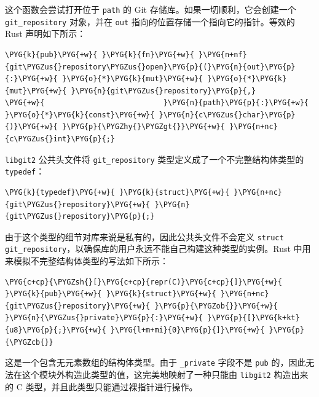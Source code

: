 这个函数会尝试打开位于 \texttt{path} 的 Git 存储库。如果一切顺利，它会创建一个 \texttt{git\_repository} 对象，并在 \texttt{out} 指向的位置存储一个指向它的指针。等效的 Rust 声明如下所示：

\begin{Verbatim}[commandchars=\\\{\},breaklines=true,breakanywhere=true,fontsize=\codefont,xleftmargin=17bp]
\PYG{k}{pub}\PYG{+w}{ }\PYG{k}{fn}\PYG{+w}{ }\PYG{n+nf}{git\PYGZus{}repository\PYGZus{}open}\PYG{p}{(}\PYG{n}{out}\PYG{p}{:}\PYG{+w}{ }\PYG{o}{*}\PYG{k}{mut}\PYG{+w}{ }\PYG{o}{*}\PYG{k}{mut}\PYG{+w}{ }\PYG{n}{git\PYGZus{}repository}\PYG{p}{,}
\PYG{+w}{                           }\PYG{n}{path}\PYG{p}{:}\PYG{+w}{ }\PYG{o}{*}\PYG{k}{const}\PYG{+w}{ }\PYG{n}{c\PYGZus{}char}\PYG{p}{)}\PYG{+w}{ }\PYG{p}{\PYGZhy{}\PYGZgt{}}\PYG{+w}{ }\PYG{n+nc}{c\PYGZus{}int}\PYG{p}{;}
\end{Verbatim}

\texttt{libgit2} 公共头文件将 \texttt{git\_repository} 类型定义成了一个不完整结构体类型的 \texttt{typedef}：

\begin{Verbatim}[commandchars=\\\{\},breaklines=true,breakanywhere=true,fontsize=\codefont,xleftmargin=17bp]
\PYG{k}{typedef}\PYG{+w}{ }\PYG{k}{struct}\PYG{+w}{ }\PYG{n+nc}{git\PYGZus{}repository}\PYG{+w}{ }\PYG{n}{git\PYGZus{}repository}\PYG{p}{;}
\end{Verbatim}

由于这个类型的细节对库来说是私有的，因此公共头文件不会定义 \texttt{struct git\_repository}，以确保库的用户永远不能自己构建这种类型的实例。Rust 中用来模拟不完整结构体类型的写法如下所示：

\begin{Verbatim}[commandchars=\\\{\},breaklines=true,breakanywhere=true,fontsize=\codefont,xleftmargin=17bp]
\PYG{c+cp}{\PYGZsh{}[}\PYG{c+cp}{repr(C)}\PYG{c+cp}{]}\PYG{+w}{ }\PYG{k}{pub}\PYG{+w}{ }\PYG{k}{struct}\PYG{+w}{ }\PYG{n+nc}{git\PYGZus{}repository}\PYG{+w}{ }\PYG{p}{\PYGZob{}}\PYG{+w}{ }\PYG{n}{\PYGZus{}private}\PYG{p}{:}\PYG{+w}{ }\PYG{p}{[}\PYG{k+kt}{u8}\PYG{p}{;}\PYG{+w}{ }\PYG{l+m+mi}{0}\PYG{p}{]}\PYG{+w}{ }\PYG{p}{\PYGZcb{}}
\end{Verbatim}

这是一个包含无元素数组的结构体类型。由于 \texttt{\_private} 字段不是 \texttt{pub} 的，因此无法在这个模块外构造此类型的值，这完美地映射了一种只能由 \texttt{libgit2} 构造出来的 C 类型，并且此类型只能通过裸指针进行操作。

